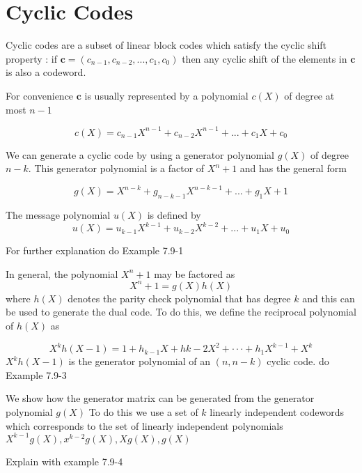 \documentclass[fontsize=12pt]{article}
\begin{document}
 \section{Cyclic Codes}
 Cyclic codes are a subset of linear block codes which satisfy the cyclic shift property : if $\mathbf{c} =(c_{n-1},c_{n-2},...,c_1,c_0)$ then any cyclic shift of the elements in 
 $\mathbf{c}$ is also a codeword.
 
 For convenience $\mathbf{c}$ is usually represented by a polynomial $c(X)$ of degree 
 at most $n-1$
 
 \begin{equation}
 c(X) =c_{n-1}X^{n-1} + c_{n-2}X^{n-1}+...+c_1X + c_0
 \end{equation}
 
We can generate a cyclic code by using a generator polynomial $g(X)$ of degree $n-k$. This generator polynomial is a factor of $X^n + 1$ and has the general form 

 \begin{equation}
 g(X) =X^{n-k} + g_{n-k-1}X^{n-k-1}+...+g_1X + 1
 \end{equation}
 
 The message polynomial $u(X)$ is defined by
  \begin{equation}
 u(X) =u_{k-1}X^{k-1} + u_{k-2}X^{k-2}+...+u_1X + u_0
 \end{equation}
 
 For further explanation do Example 7.9-1
 
 In general, the polynomial $X^n + 1$ may be factored as 
 \begin{equation}
X^n + 1 = g(X)h(X)
 \end{equation}
 where $h(X)$ denotes the parity check polynomial that has degree $k$ and this can be used to generate the dual code. To do this, we define the reciprocal polynomial of $h(X)$ as 
 
 \begin{equation}
X^kh(X-1) = 1 + h_{k-1}X + h{k-2}X^2 +\cdot\cdot\cdot + h_1X^{k-1} + X^k
 \end{equation}
 $X^kh(X-1)$ is the generator polynomial of an $(n,n-k)$ cyclic code.
  do Example 7.9-3
  
  We show how the generator matrix  can be generated from the generator polynomial $g(X)$ To do this we use a set of $k$ linearly independent codewords which corresponds to the set of linearly independent polynomials $X^{k-1}g(X), x^{k-2}g(X), Xg(X), g(X)$
  
  Explain with example 7.9-4
  
\end{document}
